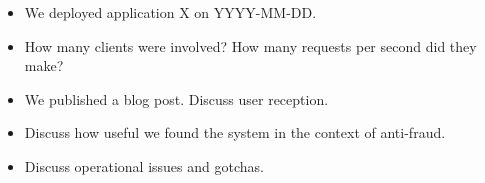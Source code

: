 \begin{itemize}
    \item We deployed application X on YYYY-MM-DD.
    \item How many clients were involved?  How many requests per second did they make?
    \item We published a blog post.  Discuss user reception.
    \item Discuss how useful we found the system in the context of anti-fraud.
    \item Discuss operational issues and gotchas.
\end{itemize}